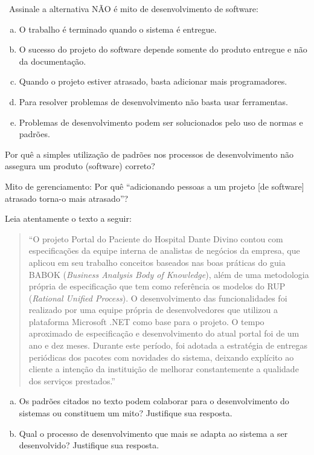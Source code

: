 ~Assinale a alternativa NÃO é mito de desenvolvimento de
software:

\begin{enumerate}[a)]
\item O trabalho é terminado quando o sistema é entregue.
\item O sucesso do projeto do software depende somente do produto
  entregue e não da documentação.
\item Quando o projeto estiver atrasado, basta adicionar mais programadores.
\item Para resolver problemas de desenvolvimento não basta usar ferramentas.
\item Problemas de desenvolvimento podem ser solucionados pelo uso de normas e padrões.
\end{enumerate}

 Por quê a simples utilização de padrões nos processos
de desenvolvimento não assegura um produto (software) correto?

 Mito de gerenciamento: Por quê ``adicionando pessoas a
um projeto [de software] atrasado torna-o mais atrasado''?

 Leia atentamente o texto a seguir:

\begin{quote}\small
  ``O projeto Portal do Paciente do Hospital Dante Divino contou com
  especificações da equipe interna de analistas de negócios da
  empresa, que aplicou em seu trabalho conceitos baseados nas boas
  práticas do guia BABOK ({\em Business Analysis Body of Knowledge}),
  além de uma metodologia própria de especificação que tem como
  referência os modelos do RUP ({\em Rational Unified Process}). O
  desenvolvimento das funcionalidades foi realizado por uma equipe
  própria de desenvolvedores que utilizou a plataforma Microsoft .NET
  como base para o projeto. O tempo aproximado de especificação e
  desenvolvimento do atual portal foi de um ano e dez meses. Durante
  este período, foi adotada a estratégia de entregas periódicas dos
  pacotes com novidades do sistema, deixando explícito ao cliente a
  intenção da instituição de melhorar constantemente a qualidade dos
  serviços prestados.''
\end{quote}

\begin{enumerate}[a)]

  \item Os padrões citados no texto podem colaborar para o desenvolvimento do sistemas ou
  constituem um mito? Justifique sua resposta.

  \item Qual o processo de desenvolvimento que mais se adapta ao sistema
  a ser desenvolvido? Justifique sua resposta.

\end{enumerate}
